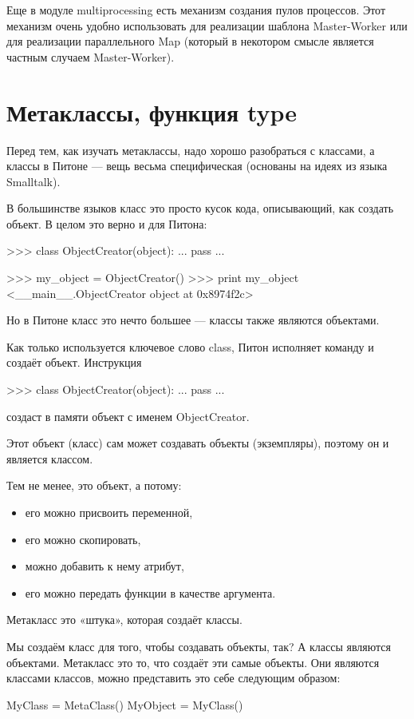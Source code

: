 Еще в модуле multiprocessing есть механизм создания пулов процессов. Этот механизм очень удобно использовать для реализации шаблона Master-Worker или для реализации параллельного Map (который в некотором смысле является частным случаем Master-Worker).

\section{Метаклассы, функция type}

	
	Перед тем, как изучать метаклассы, надо хорошо разобраться с классами, а классы в Питоне — вещь весьма специфическая (основаны на идеях из языка Smalltalk).

В большинстве языков класс это просто кусок кода, описывающий, как создать объект. В целом это верно и для Питона:
\begin{python}
  >>> class ObjectCreator(object):
  ...       pass
  ... 

  >>> my_object = ObjectCreator()
  >>> print my_object
  <__main__.ObjectCreator object at 0x8974f2c>
  \end{python}

Но в Питоне класс это нечто большее — классы также являются объектами.

Как только используется ключевое слово class, Питон исполняет команду и создаёт объект. Инструкция
\begin{python}
  >>> class ObjectCreator(object):
  ...       pass
  ...
  \end{python}

создаст в памяти объект с именем ObjectCreator.

Этот объект (класс) сам может создавать объекты (экземпляры), поэтому он и является классом.

Тем не менее, это объект, а потому:
\begin{itemize}
	\item	его можно присвоить переменной,
	\item	его можно скопировать,
	\item	можно добавить к нему атрибут,
	\item	его можно передать функции в качестве аргумента.
\end{itemize}

Метакласс это «штука», которая создаёт классы.

Мы создаём класс для того, чтобы создавать объекты, так? А классы являются объектами. Метакласс это то, что создаёт эти самые объекты. Они являются классами классов, можно представить это себе следующим образом:
\begin{python}
  MyClass = MetaClass()
  MyObject = MyClass()
\end{python}

